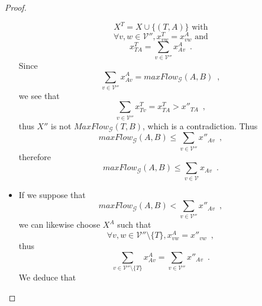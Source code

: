 \documentclass[11pt]{llncs}
\begin{document}
\begin{proof}
\begin{itemize}
          \begin{equation}
             X^T = X \cup \{(T, A)\} \mbox{ with}
          \end{equation}
          \begin{equation}
             \forall v, w \in \mathcal{V}'', x^T_{vw} = x^A_{vw} \mbox{ and}
          \end{equation}
          \begin{equation}
             x^T_{TA} = \sum\limits_{v \in \mathcal{V}''}x^A_{Av} \enspace.
          \end{equation}
          Since
          \begin{equation}
             \sum\limits_{v \in \mathcal{V}''}x^A_{Av} = maxFlow_{\mathcal{G}}\left(A, B\right) \enspace,
          \end{equation}
          we see that
          \begin{equation}
             \sum\limits_{v \in \mathcal{V}''}x^T_{Tv} = x^T_{TA} > x''_{TA} \enspace,
          \end{equation}
          thus $X''$ is not $MaxFlow_{\mathcal{G}}\left(T, B\right)$, which is a contradiction. Thus
          \begin{equation}
             maxFlow_{\mathcal{G}}\left(A, B\right) \leq \sum\limits_{v \in \mathcal{V}''}x''_{Av} \enspace,
          \end{equation}
          therefore
          \begin{equation}
             maxFlow_{\mathcal{G}}\left(A, B\right) \leq \sum\limits_{v \in \mathcal{V}}x_{Av} \enspace.
          \end{equation}
          \item If we suppose that
          \begin{equation}
             maxFlow_{\mathcal{G}}\left(A, B\right) < \sum\limits_{v \in \mathcal{V}''}x''_{Av} \enspace,
          \end{equation}
          we can likewise choose $X^A$ such that
          \begin{equation}
             \forall v, w \in \mathcal{V}'' \setminus \{T\}, x^A_{vw} = x''_{vw} \enspace,
          \end{equation}
          thus
          \begin{equation}
             \sum\limits_{v \in \mathcal{V}'' \setminus \{T\}}x^A_{Av} = \sum\limits_{v \in \mathcal{V}''}x''_{Av} \enspace.
          \end{equation}
          We deduce that
          \begin{equation}

\end{equation}
\end{itemize}
\end{proof}
\end{document}
